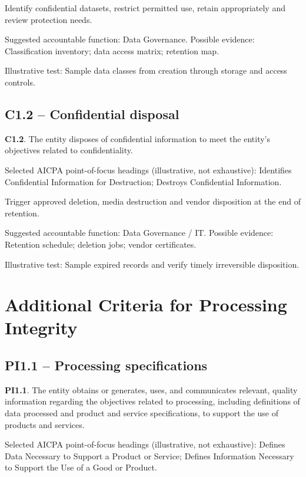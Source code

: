 \documentclass[10pt,oneside]{report}
\begin{document}
\begin{engineeringbox}
Identify confidential datasets, restrict permitted use, retain appropriately and review protection needs.
\end{engineeringbox}
Suggested accountable function: Data Governance. Possible evidence: Classification inventory; data access matrix; retention map.

Illustrative test: Sample data classes from creation through storage and access controls.

\subsection*{C1.2 -- Confidential disposal}
\begin{aicpabox}
\textbf{C1.2}. The entity disposes of confidential information to meet the entity's objectives related to confidentiality.\par{}
\end{aicpabox}
Selected AICPA point-of-focus headings (illustrative, not exhaustive): Identifies Confidential Information for Destruction; Destroys Confidential Information.

\begin{engineeringbox}
Trigger approved deletion, media destruction and vendor disposition at the end of retention.
\end{engineeringbox}
Suggested accountable function: Data Governance / IT. Possible evidence: Retention schedule; deletion jobs; vendor certificates.

Illustrative test: Sample expired records and verify timely irreversible disposition.

\section{Additional Criteria for Processing Integrity}
\subsection*{PI1.1 -- Processing specifications}
\begin{aicpabox}
\textbf{PI1.1}. The entity obtains or generates, uses, and communicates relevant, quality information regarding the objectives related to processing, including definitions of data processed and product and service specifications, to support the use of products and services.\par{}
\end{aicpabox}
Selected AICPA point-of-focus headings (illustrative, not exhaustive): Defines Data Necessary to Support a Product or Service; Defines Information Necessary to Support the Use of a Good or Product.
\end{document}
